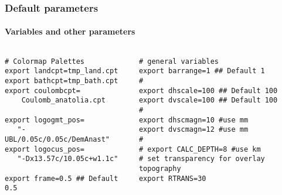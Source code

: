 \begin{frame}[t,fragile]
  \frametitle{Default parameters}
  \framesubtitle{Variables and other parameters}
  \label{fr3:frank_tr}
\begin{columns}[t]
  \begin{column}{.45\textwidth}
\begin{scriptsize}
	\begin{verbatim}
# Colormap Palettes
export landcpt=tmp_land.cpt
export bathcpt=tmp_bath.cpt
export coulombcpt=
	Coulomb_anatolia.cpt

export logogmt_pos=
   "-UBL/0.05c/0.05c/DemAnast"
export logocus_pos=
   "-Dx13.57c/10.05c+w1.1c"

export frame=0.5 ## Default 0.5
\end{verbatim}
	\end{scriptsize}
  \end{column}
  \begin{column}{.54\textwidth}
\begin{scriptsize}
	\begin{verbatim}
# general variables
export barrange=1 ## Default 1
#
export dhscale=100 ## Default 100
export dvscale=100 ## Default 100
#
export dhscmagn=10 #use mm
export dvscmagn=12 #use mm
#
# export CALC_DEPTH=8 #use km
# set transparency for overlay topography
export RTRANS=30
\end{verbatim}	  
	\end{scriptsize}
  \end{column}
\end{columns}
\end{frame}
\note{} %




















